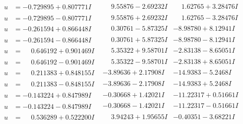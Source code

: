 \documentclass[1p]{elsarticle_modified}
\theoremstyle{definition}
\begin{document}
$$\begin{array}{c|c|c}
\begin{aligned}
u &= -0.729895 + 0.807771 I\end{aligned}
 & \phantom{-}9.55876 - 2.69232 I & \phantom{-}1.62765 + 3.28476 I \\ \hline\begin{aligned}
u &= -0.729895 - 0.807771 I\end{aligned}
 & \phantom{-}9.55876 + 2.69232 I & \phantom{-}1.62765 - 3.28476 I \\ \hline\begin{aligned}
u &= -0.261594 + 0.866448 I\end{aligned}
 & \phantom{-}0.30761 - 5.87325 I & -8.98780 + 8.12941 I \\ \hline\begin{aligned}
u &= -0.261594 - 0.866448 I\end{aligned}
 & \phantom{-}0.30761 + 5.87325 I & -8.98780 - 8.12941 I \\ \hline\begin{aligned}
u &= \phantom{-}0.646192 + 0.901469 I\end{aligned}
 & \phantom{-}5.35322 + 9.58701 I & -2.83138 - 8.65051 I \\ \hline\begin{aligned}
u &= \phantom{-}0.646192 - 0.901469 I\end{aligned}
 & \phantom{-}5.35322 - 9.58701 I & -2.83138 + 8.65051 I \\ \hline\begin{aligned}
u &= \phantom{-}0.211383 + 0.848155 I\end{aligned}
 & -3.89636 + 2.17908 I & -14.9383 - 5.2468 I \\ \hline\begin{aligned}
u &= \phantom{-}0.211383 - 0.848155 I\end{aligned}
 & -3.89636 - 2.17908 I & -14.9383 + 5.2468 I \\ \hline\begin{aligned}
u &= -0.143224 + 0.847989 I\end{aligned}
 & -0.30668 + 1.42021 I & -11.22317 + 0.51661 I \\ \hline\begin{aligned}
u &= -0.143224 - 0.847989 I\end{aligned}
 & -0.30668 - 1.42021 I & -11.22317 - 0.51661 I \\ \hline\begin{aligned}
u &= \phantom{-}0.536289 + 0.522200 I\end{aligned}
 & \phantom{-}3.94243 + 1.95655 I & -0.40351 - 3.68221 I \\ \hline\begin{aligned}

\end{aligned}
\end{array}$$
\end{document}
